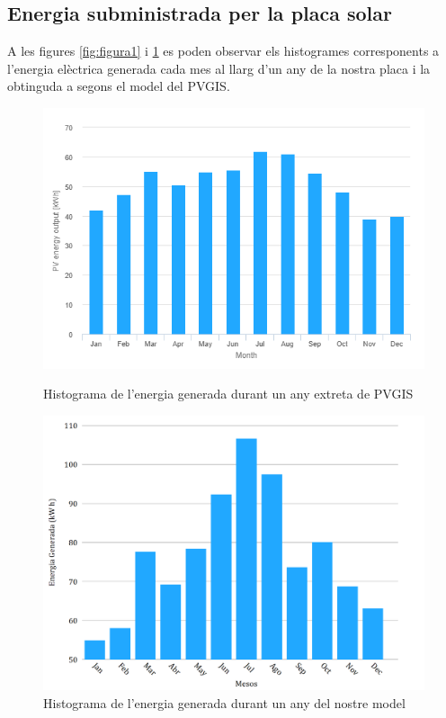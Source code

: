 \documentclass[10pt, twoside, a4paper]{article}
\begin{document}
\subsection{Energia subministrada per la placa solar}
A les figures \ref{fig:figura1} i \ref{fig:figura2} es poden observar els histogrames corresponents a l'energia elèctrica generada cada mes al llarg d'un any de la nostra placa i la obtinguda a segons el model del PVGIS. 

\begin{figure}[!ht]
    \centering
    \begin{minipage}{0.48\linewidth} 
        \centering
        \includegraphics[width=\linewidth]{Histograma_PVGIS.png}
        \caption{Histograma de l'energia generada durant un any extreta de PVGIS}
        \label{fig:figura1}
    \end{minipage}\hfill 
    \begin{minipage}{0.48\linewidth} 
        \centering
        \includegraphics[width=\linewidth]{../Mov_sol/histograma.png}
        \caption{Histograma de l'energia generada durant un any del nostre model}
        \label{fig:figura2}
    \end{minipage}
\end{figure}
\end{document}
